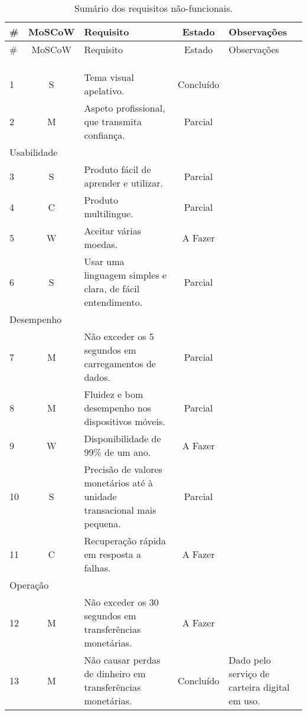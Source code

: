 \begin{center}
\begin{longtable}{@{}lcp{}cp{}@{}}
    \toprule \#  & MoSCoW & Requisito    & Estado   & Observações \\ \midrule
    \endfirsthead
    \toprule \#  & MoSCoW & Requisito    & Estado   & Observações \\ \midrule
    \endhead
    \bottomrule
    \caption{Sumário dos requisitos não-funcionais.}\label{tab:non_func}\\%
    \endfoot
    \bottomrule
    \caption[]{Sumário dos requisitos não-funcionais.}\\%
    \endlastfoot
    \multicolumn{5}{l}{\color{gray} Aparência} \\
    1   & S & Tema visual apelativo. & Concluído &  \\
    2   & M & Aspeto profissional, que transmita confiança. & Parcial &  \\
    \multicolumn{5}{l}{\color{gray} Usabilidade} \\
    3   & S & Produto fácil de aprender e utilizar. & Parcial &  \\
    4   & C & Produto multilingue. & Parcial &  \\
    5   & W & Aceitar várias moedas. & A Fazer &  \\
    6   & S & Usar uma linguagem simples e clara, de fácil entendimento. & Parcial  &  \\
    \multicolumn{5}{l}{\color{gray} Desempenho} \\
    7   & M & Não exceder os 5 segundos em carregamentos de dados. & Parcial  &  \\
    8   & M & Fluidez e bom desempenho nos dispositivos móveis. & Parcial &  \\
    9   & W & Disponibilidade de 99\% de um ano. & A Fazer &  \\
    10  & S & Precisão de valores monetários até à unidade transacional mais pequena. & Parcial &  \\
    11  & C & Recuperação rápida em resposta a falhas. & A Fazer &  \\
    \multicolumn{5}{l}{\color{gray} Operação} \\
    12  & M & Não exceder os 30 segundos em transferências monetárias. & A Fazer &  \\
    13  & M & Não causar perdas de dinheiro em transferências monetárias. & Concluído & Dado pelo serviço de carteira digital em uso. \\

\end{longtable}
\end{center}
